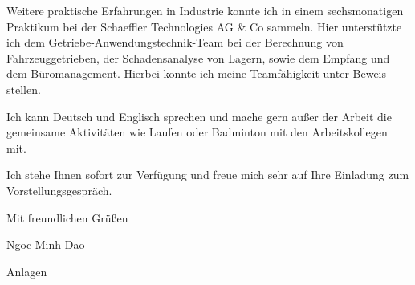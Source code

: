 \documentclass[11pt,a4paper]{letter}
\begin{document}
Weitere praktische Erfahrungen in Industrie konnte ich in einem sechsmonatigen Praktikum bei der Schaeffler Technologies AG \& Co sammeln.
Hier unterstützte ich dem Getriebe-Anwendungstechnik-Team bei der Berechnung von Fahrzeuggetrieben, der Schadensanalyse von Lagern, sowie dem Empfang und dem Büromanagement.
Hierbei konnte ich meine Teamfähigkeit unter Beweis stellen.

Ich kann Deutsch und Englisch sprechen und mache gern außer der Arbeit die gemeinsame Aktivitäten wie Laufen oder Badminton mit den Arbeitskollegen mit.

Ich stehe Ihnen sofort zur Verfügung und freue mich sehr auf Ihre Einladung zum Vorstellungsgespräch.

\vspace{1em}

Mit freundlichen Grüßen

Ngoc Minh Dao

Anlagen
\end{document}
